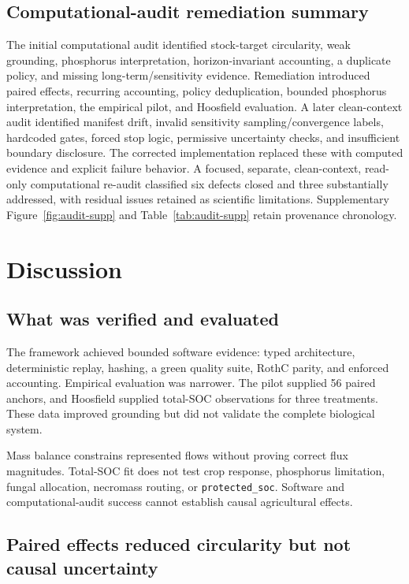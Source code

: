 \documentclass[11pt]{article}
\newcommand{\protectedSOC}{\texttt{protected\_soc}}
\begin{document}
\subsection{Computational-audit remediation summary}

The initial computational audit identified stock-target circularity, weak grounding, phosphorus interpretation, horizon-invariant accounting, a duplicate policy, and missing long-term/sensitivity evidence. Remediation introduced paired effects, recurring accounting, policy deduplication, bounded phosphorus interpretation, the empirical pilot, and Hoosfield evaluation. A later clean-context audit identified manifest drift, invalid sensitivity sampling/convergence labels, hardcoded gates, forced stop logic, permissive uncertainty checks, and insufficient boundary disclosure. The corrected implementation replaced these with computed evidence and explicit failure behavior. A focused, separate, clean-context, read-only computational re-audit classified six defects closed and three substantially addressed, with residual issues retained as scientific limitations. Supplementary Figure~\ref{fig:audit-supp} and Table~\ref{tab:audit-supp} retain provenance chronology.

\section{Discussion}

\subsection{What was verified and evaluated}

The framework achieved bounded software evidence: typed architecture, deterministic replay, hashing, a green quality suite, RothC parity, and enforced accounting. Empirical evaluation was narrower. The pilot supplied 56 paired anchors, and Hoosfield supplied total-SOC observations for three treatments. These data improved grounding but did not validate the complete biological system.

Mass balance constrains represented flows without proving correct flux magnitudes. Total-SOC fit does not test crop response, phosphorus limitation, fungal allocation, necromass routing, or \protectedSOC{}. Software and computational-audit success cannot establish causal agricultural effects.

\subsection{Paired effects reduced circularity but not causal uncertainty}
\end{document}
